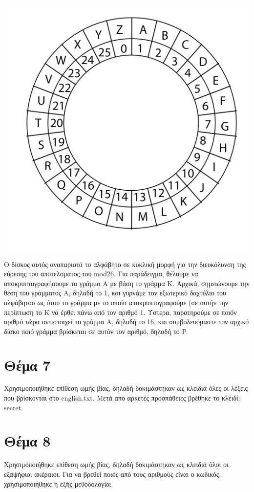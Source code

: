 \documentclass[a4paper, 11pt]{article}
\newcommand{\lt}{\latintext}
\begin{document}
\centerline{\includegraphics[scale=0.5]{disk.png}}

Ο δίσκος αυτός αναπαριστά το αλφάβητο σε κυκλική μορφή για την διευκόλυνση της εύρεσης του αποτελσματος του {\lt mod26}.
Για παράδειγμα, θέλουμε να αποκρυπτογραφήσουμε το γράμμα Α με βάση το γράμμα Κ.
Αρχικά, σημειώνουμε την θέση του γράμματος Α, δηλαδή το 1, και γυρνάμε τον εξωτερικό δαχτύλιο του αλφάβητου ως ότου το γράμμα με το οποίο
αποκρυπτογραφούμε (σε αυτήν την περίπτωση το Κ να έρθει πάνω από τον αριθμό 1.
Ύστερα, παρατηρούμε σε ποιόν αριθμό τώρα αντιστοιχεί το γράμμα Α, δηλαδή το 16, και
συμβολευόμαστε τον αρχικό δίσκο ποιό γράμμα βρίσκεται σε αυτόν τον αριθμό, δηλαδή το {\lt P}.


\newpage


\section*{Θέμα 7}
Χρησιμοποιήθηκε επίθεση ωμής βίας, δηλαδή δοκιμάστηκαν ως κλειδιά όλες οι λέξεις που βρίσκονται στο {\lt english.txt}. Μετά απο αρκετές προσπάθειες
βρέθηκε το κλειδί: {\lt secret}.



\newpage


\section*{Θέμα 8}
Χρησιμοποιήθηκε επίθεση ωμής βίας, δηλαδή δοκιμάστηκαν ως κλειδιά όλοι οι εξαψήφιοι ακέραιοι. Για να βρεθεί ποιός από τους αριθμούς είναι ο κωδικός, χρησιμοποιήθηκε η εξής μεθοδολογία:\\
\end{document}
